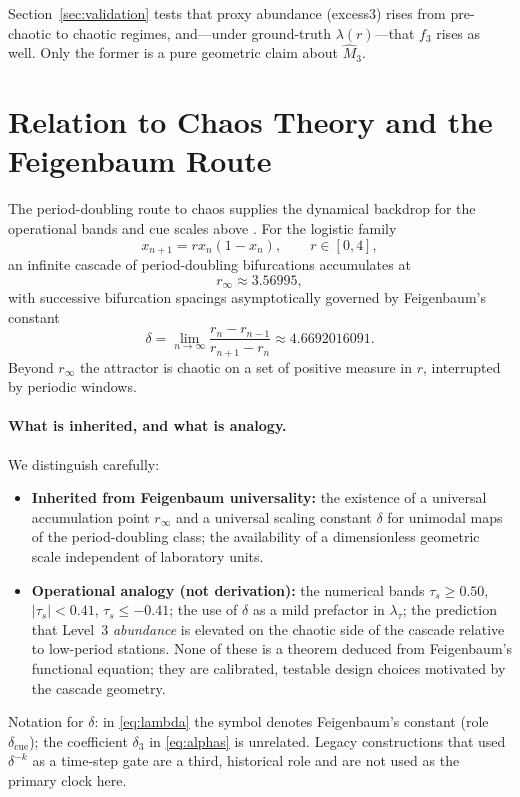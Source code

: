 \documentclass[11pt,a4paper]{article}
\begin{document}
Section~\ref{sec:validation} tests that proxy abundance (excess3) rises
from pre-chaotic to chaotic regimes, and---under ground-truth
$\lambda(r)$---that $f_3$ rises as well. Only the former is a pure
geometric claim about $\widehat{M}_3$.

\section{Relation to Chaos Theory and the Feigenbaum Route}
\label{sec:chaos}

The period-doubling route to chaos supplies the dynamical backdrop for
the operational bands and cue scales above
\cite{Feigenbaum1978,Feigenbaum1983}. For the logistic family
\begin{equation}
x_{n+1}=r x_n(1-x_n),\qquad r\in[0,4],
\end{equation}
an infinite cascade of period-doubling bifurcations accumulates at
\begin{equation}
r_\infty\approx 3.56995,
\end{equation}
with successive bifurcation spacings asymptotically governed by
Feigenbaum's constant
\begin{equation}
\delta
=\lim_{n\to\infty}
\frac{r_n-r_{n-1}}{r_{n+1}-r_n}
\approx 4.6692016091.
\end{equation}
Beyond $r_\infty$ the attractor is chaotic on a set of positive measure
in $r$, interrupted by periodic windows.

\paragraph{What is inherited, and what is analogy.}
We distinguish carefully:
\begin{itemize}[leftmargin=*,itemsep=2pt]
  \item \textbf{Inherited from Feigenbaum universality:} the existence
  of a universal accumulation point $r_\infty$ and a universal scaling
  constant $\delta$ for unimodal maps of the period-doubling class; the
  availability of a dimensionless geometric scale independent of
  laboratory units.
  \item \textbf{Operational analogy (not derivation):} the numerical
  bands $\tau_s\geq 0.50$, $|\tau_s|<0.41$, $\tau_s\leq -0.41$; the use
  of $\delta$ as a mild prefactor in $\lambda_\tau$; the prediction that
  Level~3 \emph{abundance} is elevated on the chaotic side of the
  cascade relative to low-period stations. None of these is a theorem
  deduced from Feigenbaum's functional equation; they are calibrated,
  testable design choices motivated by the cascade geometry.
\end{itemize}
Notation for $\delta$: in \eqref{eq:lambda} the symbol denotes
Feigenbaum's constant (role $\delta_{\mathrm{cue}}$); the coefficient
$\delta_3$ in \eqref{eq:alphas} is unrelated. Legacy constructions that
used $\delta^{-k}$ as a time-step gate
\cite{Padilla2026synthesis} are a third, historical role and are not
used as the primary clock here.
\end{document}
